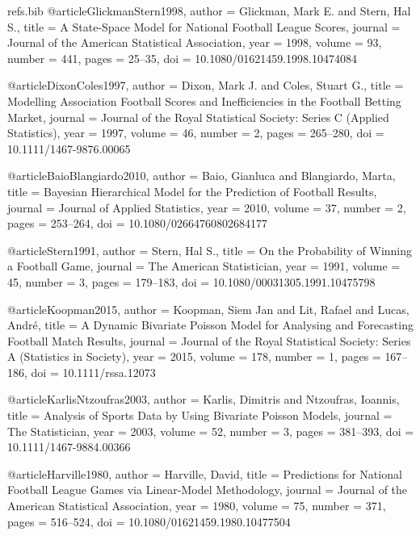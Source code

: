 \documentclass[11pt]{amsart}
\begin{document}
\begin{filecontents*}{refs.bib}
@article{GlickmanStern1998,
  author  = {Glickman, Mark E. and Stern, Hal S.},
  title   = {A State-Space Model for {N}ational {F}ootball {L}eague Scores},
  journal = {Journal of the American Statistical Association},
  year    = {1998},
  volume  = {93},
  number  = {441},
  pages   = {25--35},
  doi     = {10.1080/01621459.1998.10474084}
}

@article{DixonColes1997,
  author  = {Dixon, Mark J. and Coles, Stuart G.},
  title   = {Modelling Association Football Scores and Inefficiencies in the Football Betting Market},
  journal = {Journal of the Royal Statistical Society: Series C (Applied Statistics)},
  year    = {1997},
  volume  = {46},
  number  = {2},
  pages   = {265--280},
  doi     = {10.1111/1467-9876.00065}
}

@article{BaioBlangiardo2010,
  author  = {Baio, Gianluca and Blangiardo, Marta},
  title   = {Bayesian Hierarchical Model for the Prediction of Football Results},
  journal = {Journal of Applied Statistics},
  year    = {2010},
  volume  = {37},
  number  = {2},
  pages   = {253--264},
  doi     = {10.1080/02664760802684177}
}

@article{Stern1991,
  author  = {Stern, Hal S.},
  title   = {On the Probability of Winning a Football Game},
  journal = {The American Statistician},
  year    = {1991},
  volume  = {45},
  number  = {3},
  pages   = {179--183},
  doi     = {10.1080/00031305.1991.10475798}
}

@article{Koopman2015,
  author  = {Koopman, Siem Jan and Lit, Rafael and Lucas, Andr{\'e}},
  title   = {A Dynamic Bivariate Poisson Model for Analysing and Forecasting Football Match Results},
  journal = {Journal of the Royal Statistical Society: Series A (Statistics in Society)},
  year    = {2015},
  volume  = {178},
  number  = {1},
  pages   = {167--186},
  doi     = {10.1111/rssa.12073}
}

@article{KarlisNtzoufras2003,
  author  = {Karlis, Dimitris and Ntzoufras, Ioannis},
  title   = {Analysis of Sports Data by Using Bivariate Poisson Models},
  journal = {The Statistician},
  year    = {2003},
  volume  = {52},
  number  = {3},
  pages   = {381--393},
  doi     = {10.1111/1467-9884.00366}
}

@article{Harville1980,
  author  = {Harville, David},
  title   = {Predictions for National Football League Games via Linear-Model Methodology},
  journal = {Journal of the American Statistical Association},
  year    = {1980},
  volume  = {75},
  number  = {371},
  pages   = {516--524},
  doi     = {10.1080/01621459.1980.10477504}
}


\end{filecontents*}
\end{document}
